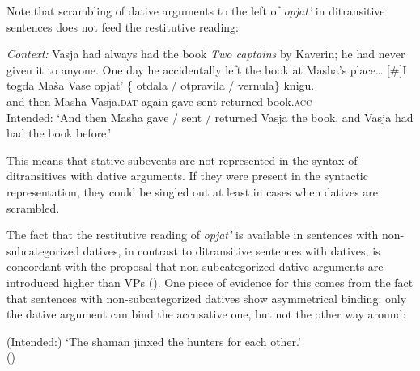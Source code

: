 \documentclass[output=paper]{langscibook}
\begin{document}
Note that scrambling of dative arguments to the left of \textit{opjat’} in ditransitive sentences does not feed the restitutive reading:


 \ea\label{ex:bondarenko:33}
\textit{Context:} Vasja had always had the book \textit{Two captains} by Kaverin; he had never given it to anyone. One day he accidentally left the book at Masha’s place\dots
\exi{}[\#]{\gll I togda Maša Vase opjat’ \{\hspace{-2pt} otdala / otpravila / vernula\} knigu.\\
     and then Masha Vasja.\textsc{dat} again {} gave {} sent {} returned book.\textsc{acc}\\
\glt Intended: `And then Masha gave / sent / returned Vasja the book, and Vasja had had the book before.'}
\z

\noindent This means that stative subevents are not represented in the syntax of ditransitives with dative arguments. If they were present in the syntactic representation, they could be singled out at least in cases when datives are scrambled.



The fact that the restitutive reading of \textit{opjat’} is available in sentences with non-subcategorized datives, in contrast to ditransitive sentences with datives, is concordant with the proposal that non-subcategorized dative arguments are introduced higher than VPs (\citealt{Boneh-Nash2017}). One piece of evidence for this comes from the fact that sentences with non-subcategorized datives show asymmetrical binding: only the dative argument can bind the accusative one, but not the other way around:\largerpage


 \ea\label{ex:bondarenko:34}
\z
\glt (Intended:) `The shaman jinxed the hunters for each other.'\\\hfill (\citealt{Boneh-Nash2017})
\z
\end{document}
